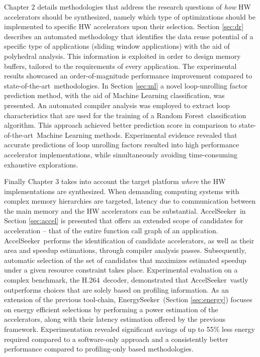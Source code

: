 \documentclass[]{usiinfthesis}
\newcommand{\aseeker}{{AccelSeeker}}
\newcommand{\eseeker}{{EnergySeeker}}
\newcommand{\htsf}{{H.264}}
\newcommand{\SoTA}{{state-of-the-art}}
\newcommand{\RF}{{Random Forest}}
\begin{document}
Chapter 2 details methodologies that address the research questions of {\em how} HW
accelerators should be synthesized, namely which type of optimizations should be implemented
to specific HW accelerators upon their selection. Section \ref{sec:dr} describes an automated 
methodology that identifies the data reuse potential of a specific type of applications
(sliding window applications) with the aid of polyhedral analysis. This information is 
exploited in order to design memory buffers, tailored to the requirements of every application. 
The experimental results showcased an order-of-magnitude performance improvement compared to \SoTA\ 
methodologies.
In Section \ref{sec:ml} a novel loop-unrolling factor prediction 
method, with the aid of Machine Learning classification, was presented. An automated compiler
analysis was employed to extract loop characteristics that are used for the training of a \RF\ 
classification algorithm. 
This approach achieved better prediction score in comparison to \SoTA\ Machine Learning methods. 
Experimental evidence revealed that 
accurate predictions of loop unrolling factors resulted into high performance accelerator 
implementations, while simultaneously avoiding 
time-consuming exhaustive explorations.\par

Finally Chapter 3 takes into account the target platform {\em where} the HW implementations are 
synthesized. When demanding computing systems with complex memory hierarchies are targeted, 
latency due to communication between the main memory and the HW accelerators
can be substantial. \aseeker\ in Section \ref{sec:accel} is presented that offers an extended 
scope of candidates for acceleration -- that of the entire function call graph of an application. 
\aseeker\ performs the identification of candidate accelerators, as well as their area and speedup 
estimations, through compiler analysis passes. Subsequently, automatic selection of the set of 
candidates that maximizes estimated speedup under a given resource constraint takes place. 
Experimental evaluation on a complex benchmark, the \htsf\ decoder, demonstrated that 
\aseeker\ vastly outperforms choices that are solely based on profiling information.
As an extension of the previous tool-chain, \eseeker\ (Section \ref{sec:energy}) focuses on 
energy efficient selections by performing a power estimation of the accelerators, along with 
their latency estimation offered by the previous framework. Experimentation revealed significant 
savings of up to 55\% less energy required compared to a software-only approach and a 
consistently better performance compared to profiling-only based methodologies.\par
\end{document}
